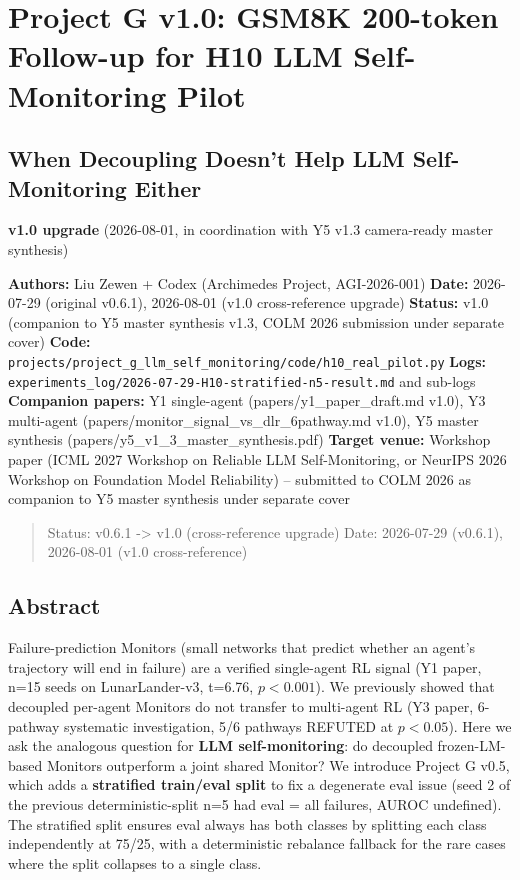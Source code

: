 \documentclass[
]{article}
\author{}
\date{}
\begin{document}
\section{Project G v1.0: GSM8K 200-token Follow-up for H10 LLM
Self-Monitoring
Pilot}\label{project-g-v1.0-gsm8k-200-token-follow-up-for-h10-llm-self-monitoring-pilot}

\subsection{When Decoupling Doesn't Help LLM Self-Monitoring
Either}\label{when-decoupling-doesnt-help-llm-self-monitoring-either}

\textbf{v1.0 upgrade} (2026-08-01, in coordination with Y5 v1.3
camera-ready master synthesis)

\textbf{Authors:} Liu Zewen + Codex (Archimedes Project, AGI-2026-001)
\textbf{Date:} 2026-07-29 (original v0.6.1), 2026-08-01 (v1.0
cross-reference upgrade) \textbf{Status:} v1.0 (companion to Y5 master
synthesis v1.3, COLM 2026 submission under separate cover)
\textbf{Code:}
\texttt{projects/project\_g\_llm\_self\_monitoring/code/h10\_real\_pilot.py}
\textbf{Logs:}
\texttt{experiments\_log/2026-07-29-H10-stratified-n5-result.md} and
sub-logs \textbf{Companion papers:} Y1 single-agent
(papers/y1\_paper\_draft.md v1.0), Y3 multi-agent
(papers/monitor\_signal\_vs\_dlr\_6pathway.md v1.0), Y5 master synthesis
(papers/y5\_v1\_3\_master\_synthesis.pdf) \textbf{Target venue:}
Workshop paper (ICML 2027 Workshop on Reliable LLM Self-Monitoring, or
NeurIPS 2026 Workshop on Foundation Model Reliability) -- submitted to
COLM 2026 as companion to Y5 master synthesis under separate cover

\begin{quote}
Status: v0.6.1 -\textgreater{} v1.0 (cross-reference upgrade) Date:
2026-07-29 (v0.6.1), 2026-08-01 (v1.0 cross-reference)
\end{quote}

\subsection{Abstract}\label{abstract}

Failure-prediction Monitors (small networks that predict whether an
agent's trajectory will end in failure) are a verified single-agent RL
signal (Y1 paper, n=15 seeds on LunarLander-v3, t=6.76, \(p<0.001\)). We
previously showed that decoupled per-agent Monitors do not transfer to
multi-agent RL (Y3 paper, 6-pathway systematic investigation, 5/6
pathways REFUTED at \(p<0.05\)). Here we ask the analogous question for
\textbf{LLM self-monitoring}: do decoupled frozen-LM-based Monitors
outperform a joint shared Monitor? We introduce Project G v0.5, which
adds a \textbf{stratified train/eval split} to fix a degenerate eval
issue (seed 2 of the previous deterministic-split n=5 had eval = all
failures, AUROC undefined). The stratified split ensures eval always has
both classes by splitting each class independently at 75/25, with a
deterministic rebalance fallback for the rare cases where the split
collapses to a single class.
\end{document}
